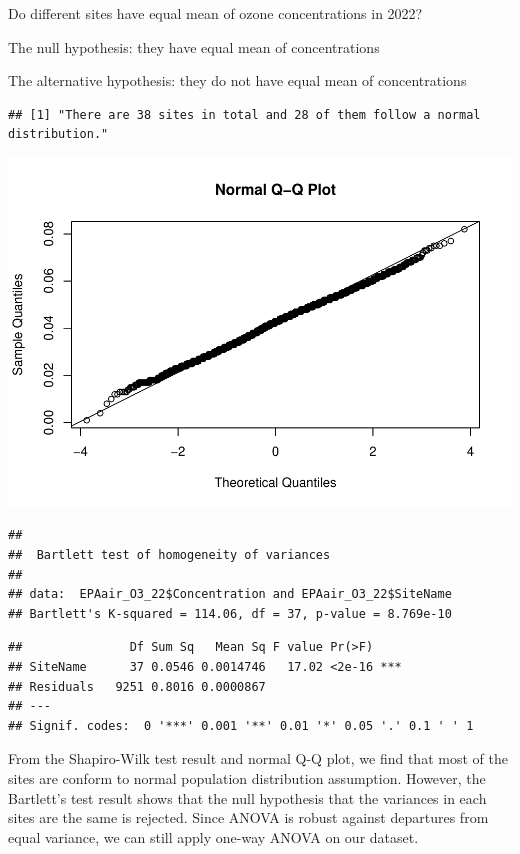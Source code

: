 \documentclass[
  12pt,
]{article}
\begin{document}
Do different sites have equal mean of ozone concentrations in 2022?

The null hypothesis: they have equal mean of concentrations

The alternative hypothesis: they do not have equal mean of
concentrations

\begin{verbatim}
## [1] "There are 38 sites in total and 28 of them follow a normal distribution."
\end{verbatim}

\includegraphics{Project_DataAnalysis_files/figure-latex/Q2 ANOVA-1.pdf}

\begin{verbatim}
## 
##  Bartlett test of homogeneity of variances
## 
## data:  EPAair_O3_22$Concentration and EPAair_O3_22$SiteName
## Bartlett's K-squared = 114.06, df = 37, p-value = 8.769e-10
\end{verbatim}

\begin{verbatim}
##               Df Sum Sq   Mean Sq F value Pr(>F)    
## SiteName      37 0.0546 0.0014746   17.02 <2e-16 ***
## Residuals   9251 0.8016 0.0000867                   
## ---
## Signif. codes:  0 '***' 0.001 '**' 0.01 '*' 0.05 '.' 0.1 ' ' 1
\end{verbatim}

From the Shapiro-Wilk test result and normal Q-Q plot, we find that most
of the sites are conform to normal population distribution assumption.
However, the Bartlett's test result shows that the null hypothesis that
the variances in each sites are the same is rejected. Since ANOVA is
robust against departures from equal variance, we can still apply
one-way ANOVA on our dataset.
\end{document}
